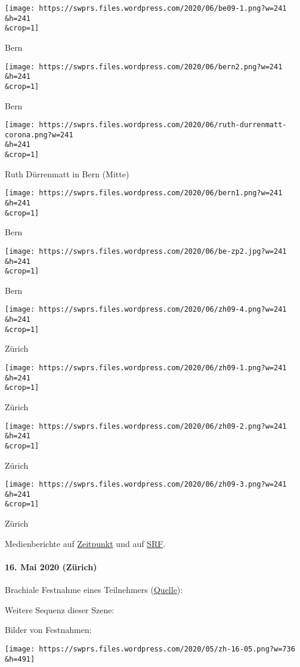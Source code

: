 \texttt{[image: https://swprs.files.wordpress.com/2020/06/be09-1.png?w=241\\\&h=241\\\&crop=1]}

Bern

\texttt{[image: https://swprs.files.wordpress.com/2020/06/bern2.png?w=241\\\&h=241\\\&crop=1]}

Bern

\texttt{[image: https://swprs.files.wordpress.com/2020/06/ruth-durrenmatt-corona.png?w=241\\\&h=241\\\&crop=1]}

Ruth Dürrenmatt in Bern (Mitte)

\texttt{[image: https://swprs.files.wordpress.com/2020/06/bern1.png?w=241\\\&h=241\\\&crop=1]}

Bern

\texttt{[image: https://swprs.files.wordpress.com/2020/06/be-zp2.jpg?w=241\\\&h=241\\\&crop=1]}

Bern

\texttt{[image: https://swprs.files.wordpress.com/2020/06/zh09-4.png?w=241\\\&h=241\\\&crop=1]}

Zürich

\texttt{[image: https://swprs.files.wordpress.com/2020/06/zh09-1.png?w=241\\\&h=241\\\&crop=1]}

Zürich

\texttt{[image: https://swprs.files.wordpress.com/2020/06/zh09-2.png?w=241\\\&h=241\\\&crop=1]}

Zürich

\texttt{[image: https://swprs.files.wordpress.com/2020/06/zh09-3.png?w=241\\\&h=241\\\&crop=1]}

Zürich

Medienberichte auf
\href{https://www.youtube.com/watch?v=9rtaeWQPSr0}{Zeitpunkt} und auf
\href{https://www.srf.ch/news/schweiz/polizei-mit-grossaufgebot-hunderte-demonstrieren-in-der-schweiz-gegen-corona-verbote}{SRF}.

\hypertarget{16-mai-2020-zuxfcrich}{%
\paragraph{16. Mai 2020 (Zürich)}\label{16-mai-2020-zuxfcrich}}

Brachiale Festnahme eines Teilnehmers
(\href{https://twitter.com/Thomas_Binder/status/1261745471615361024}{Quelle}):

Weitere Sequenz dieser Szene:

Bilder von Festnahmen:

\texttt{[image: https://swprs.files.wordpress.com/2020/05/zh-16-05.png?w=736\\\&h=491]}

